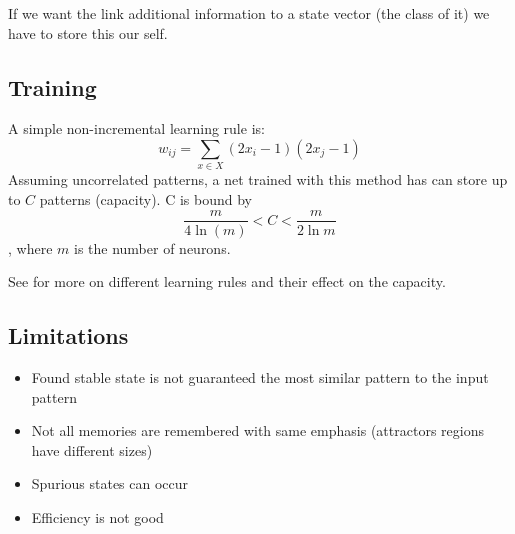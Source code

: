 If we want the link additional information to a state vector (\eg the class of it) we have to store this our self.

\subsection{Training}
A simple non-incremental learning rule is:
\begin{equation}
w_{ij} = \sum_{x \in X} (2x_i-1)(2x_j-1)
\end{equation}
Assuming uncorrelated patterns, a net trained with this method has can store up to $C$ patterns (capacity). C is bound by
\begin{equation}
\frac{m}{4 \ln(m)} < C < \frac{m}{2\ln{m}}
\end{equation}
, where $m$ is the number of neurons.


See \cite{Storkey1997} for more on different learning rules and their effect on the capacity.

\subsection{Limitations}
\begin{itemize}
\item Found stable state is not guaranteed the most similar pattern to the input pattern
\item Not all memories are remembered with same emphasis (attractors regions have different sizes)
\item Spurious states can occur
\item Efficiency is not good
\end{itemize}
